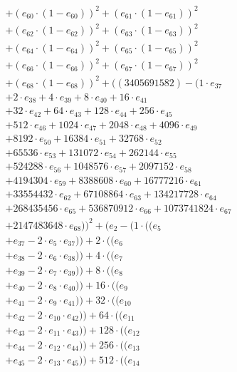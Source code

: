\documentclass[10pt, a4paper]{article}
\begin{document}
\begin{small}
\begin{align*}
& + (e_{60} \cdot (1 - e_{60}))^{2} + (e_{61} \cdot (1 - e_{61}))^{2} \\
& + (e_{62} \cdot (1 - e_{62}))^{2} + (e_{63} \cdot (1 - e_{63}))^{2} \\
& + (e_{64} \cdot (1 - e_{64}))^{2} + (e_{65} \cdot (1 - e_{65}))^{2} \\
& + (e_{66} \cdot (1 - e_{66}))^{2} + (e_{67} \cdot (1 - e_{67}))^{2} \\
& + (e_{68} \cdot (1 - e_{68}))^{2} + ((3405691582) - (1 \cdot e_{37} \\
& + 2 \cdot e_{38} + 4 \cdot e_{39} + 8 \cdot e_{40} + 16 \cdot e_{41} \\
& + 32 \cdot e_{42} + 64 \cdot e_{43} + 128 \cdot e_{44} + 256 \cdot e_{45} \\
& + 512 \cdot e_{46} + 1024 \cdot e_{47} + 2048 \cdot e_{48} + 4096 \cdot e_{49} \\
& + 8192 \cdot e_{50} + 16384 \cdot e_{51} + 32768 \cdot e_{52} \\
& + 65536 \cdot e_{53} + 131072 \cdot e_{54} + 262144 \cdot e_{55} \\
& + 524288 \cdot e_{56} + 1048576 \cdot e_{57} + 2097152 \cdot e_{58} \\
& + 4194304 \cdot e_{59} + 8388608 \cdot e_{60} + 16777216 \cdot e_{61} \\
& + 33554432 \cdot e_{62} + 67108864 \cdot e_{63} + 134217728 \cdot e_{64} \\
& + 268435456 \cdot e_{65} + 536870912 \cdot e_{66} + 1073741824 \cdot e_{67} \\
& + 2147483648 \cdot e_{68}))^{2} + (e_{2} - (1 \cdot ((e_{5} \\
& + e_{37} - 2 \cdot e_{5} \cdot e_{37})) + 2 \cdot ((e_{6} \\
& + e_{38} - 2 \cdot e_{6} \cdot e_{38})) + 4 \cdot ((e_{7} \\
& + e_{39} - 2 \cdot e_{7} \cdot e_{39})) + 8 \cdot ((e_{8} \\
& + e_{40} - 2 \cdot e_{8} \cdot e_{40})) + 16 \cdot ((e_{9} \\
& + e_{41} - 2 \cdot e_{9} \cdot e_{41})) + 32 \cdot ((e_{10} \\
& + e_{42} - 2 \cdot e_{10} \cdot e_{42})) + 64 \cdot ((e_{11} \\
& + e_{43} - 2 \cdot e_{11} \cdot e_{43})) + 128 \cdot ((e_{12} \\
& + e_{44} - 2 \cdot e_{12} \cdot e_{44})) + 256 \cdot ((e_{13} \\
& + e_{45} - 2 \cdot e_{13} \cdot e_{45})) + 512 \cdot ((e_{14} \\

\end{align*}
\end{small}
\end{document}
